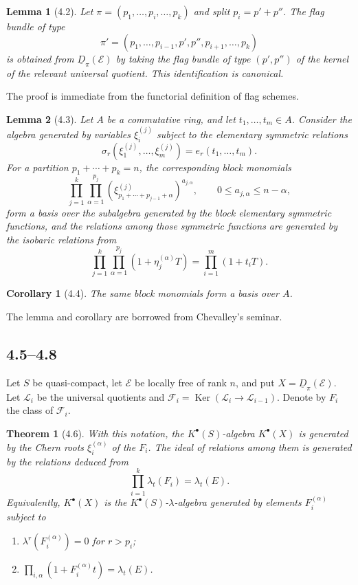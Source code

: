 \documentclass[13pt]{extarticle}
\newcommand{\Ker}{\operatorname{Ker}}
\newtheorem*{theorem}{Theorem}
\newtheorem*{corollary}{Corollary}
\newtheorem*{lemma}{Lemma}
\begin{document}
\begin{lemma}[4.2]
Let $\pi=(p_1,\ldots,p_i,\ldots,p_k)$ and split $p_i=p'+p''$. The flag bundle of type
\[
\pi'=(p_1,\ldots,p_{i-1},p',p'',p_{i+1},\ldots,p_k)
\]
is obtained from $\underline D_\pi(\mathcal E)$ by taking the flag bundle of type $(p',p'')$ of the kernel of the relevant universal quotient. This identification is canonical.
\end{lemma}
The proof is immediate from the functorial definition of flag schemes.

\begin{lemma}[4.3]
Let $A$ be a commutative ring, and let $t_1,\ldots,t_m\in A$. Consider the algebra generated by variables $\xi_i^{(j)}$ subject to the elementary symmetric relations
\[
\sigma_r(\xi_1^{(j)},\ldots,\xi_m^{(j)})=e_r(t_1,\ldots,t_m).
\]
For a partition $p_1+\cdots+p_k=n$, the corresponding block monomials
\[
\prod_{j=1}^{k}\prod_{\alpha=1}^{p_j}(\xi_{p_1+\cdots+p_{j-1}+\alpha}^{(j)})^{a_{j,\alpha}},
\qquad
0\leq a_{j,\alpha}\leq n-\alpha,
\]
form a basis over the subalgebra generated by the block elementary symmetric functions, and the relations among those symmetric functions are generated by the isobaric relations from
\[
\prod_{j=1}^{k}\prod_{\alpha=1}^{p_j}(1+\eta_j^{(\alpha)}T)=\prod_{i=1}^{m}(1+t_iT).
\]
\end{lemma}

\begin{corollary}[4.4]
The same block monomials form a basis over $A$.
\end{corollary}
The lemma and corollary are borrowed from Chevalley's seminar.

\subsection*{4.5--4.8}
Let $S$ be quasi-compact, let $\mathcal E$ be locally free of rank $n$, and put $X=\underline D_\pi(\mathcal E)$. Let $\mathcal L_i$ be the universal quotients and $\mathcal F_i=\Ker(\mathcal L_i\to\mathcal L_{i-1})$. Denote by $F_i$ the class of $\mathcal F_i$.

\begin{theorem}[4.6]\label{thm:VI.4.6}
With this notation, the $K^{\bullet}(S)$-algebra $K^{\bullet}(X)$ is generated by the Chern roots $\xi_i^{(\alpha)}$ of the $F_i$. The ideal of relations among them is generated by the relations deduced from
\begin{equation}\label{eq:VI.4.6}
\prod_{i=1}^{k}\lambda_t(F_i)=\lambda_t(E).
\end{equation}
Equivalently, $K^{\bullet}(X)$ is the $K^{\bullet}(S)$-$\lambda$-algebra generated by elements $F_i^{(\alpha)}$ subject to
\begin{enumerate}[label=(\roman*)]
\item $\lambda^r(F_i^{(\alpha)})=0$ for $r>p_i$;
\item $\prod_{i,\alpha}(1+F_i^{(\alpha)}t)=\lambda_t(E)$.
\end{enumerate}
\end{theorem}
\end{document}
